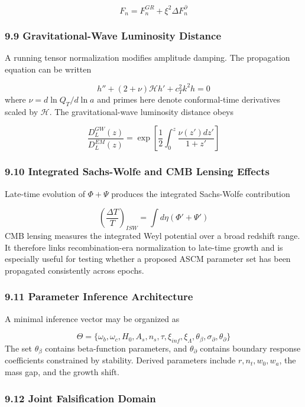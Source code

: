 \documentclass[aps,prd,onecolumn,superscriptaddress,nofootinbib,longbibliography,10pt]{revtex4-2}
\begin{document}
  \[ F_n = F_n^{GR} + \xi^2 \Delta F_n^\partial \]

  
\subsubsection*{9.9 Gravitational-Wave Luminosity Distance}

  A running tensor normalization modifies amplitude damping. The propagation equation can be written


  \[ h'' + (2 + \nu)\mathcal{H}h' + c_T^2 k^2 h = 0 \]
  where \(\nu = d\ln Q_T/d\ln a\) and primes here denote conformal-time derivatives scaled by \(\mathcal{H}\). The gravitational-wave luminosity distance obeys


  \[ \frac{D_L^{GW}(z)}{D_L^{EM}(z)} = \exp\left[ \frac{1}{2}\int_0^z \frac{\nu(z')dz'}{1 + z'} \right] \]

  
\subsubsection*{9.10 Integrated Sachs-Wolfe and CMB Lensing Effects}

  Late-time evolution of \(\Phi + \Psi\) produces the integrated Sachs-Wolfe contribution


  \[ \left(\frac{\Delta T}{T}\right)_{ISW} = \int d\eta (\Phi' + \Psi') \]
  CMB lensing measures the integrated Weyl potential over a broad redshift range. It therefore links recombination-era normalization to late-time growth and is especially useful for testing whether a proposed ASCM parameter set has been propagated consistently across epochs.



  
\subsubsection*{9.11 Parameter Inference Architecture}

  A minimal inference vector may be organized as


  \[ \Theta = \{\omega_b, \omega_c, H_0, A_s, n_s, \tau, \xi_{inf}, \xi_\Lambda, \theta_\beta, \sigma_\partial, \theta_\partial\} \]
  The set \(\theta_\beta\) contains beta-function parameters, and \(\theta_\partial\) contains boundary response coefficients constrained by stability. Derived parameters include \(r, n_t, w_0, w_a\), the mass gap, and the growth shift.



  
\subsubsection*{9.12 Joint Falsification Domain}
\end{document}

